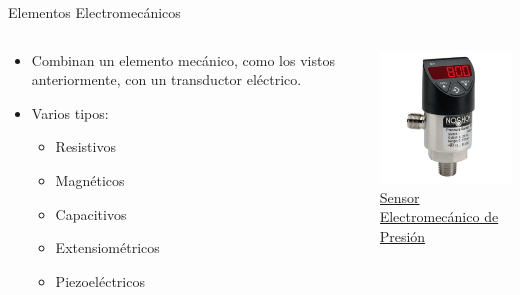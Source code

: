 \documentclass[aspectratio=169]{beamer}
\begin{document}
\begin{frame}{Elementos Electromecánicos }
    \begin{columns}[c, onlytextwidth]
        \begin{column}{0.5\textwidth}
            \begin{itemize}
                \item Combinan un elemento mecánico, como los vistos anteriormente, con un transductor eléctrico. 
                \item Varios tipos:
             \begin{itemize}
                 \item Resistivos
                 \item Magnéticos
                 \item Capacitivos
                 \item Extensiométricos
                 \item Piezoeléctricos
             \end{itemize}
            \end{itemize}
        \end{column}
        \begin{column}{0.5\textwidth}
            \centering
            \includegraphics[width=6cm]{fig/Presion/EM_Sensor.jpg}
             \\ \tiny{\href{https://www.directindustry.com/prod/noshok/product-26191-462375.html}{Sensor Electromecánico de Presión}}
        \end{column}
    \end{columns}
\end{frame}
\end{document}
